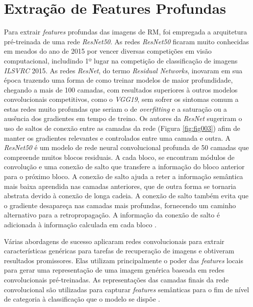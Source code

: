 \section{Extração de Features Profundas}
Para extrair \textit{features} profundas das imagens de \gls{RM}, foi empregada a arquitetura pré-treinada de uma rede \textit{ResNet50}. As redes \textit{ResNet50} ficaram muito conhecidas em meados do ano de 2015 por vencer diversas competições em visão computacional, includindo 1º lugar na competição de classificação de imagens \textit{ILSVRC} 2015. As redes \textit{ResNet}, do termo \textit{Residual Networks}, inovaram em sua época trazendo uma forma  de como treinar modelos de maior profundidade, chegando a mais de 100 camadas, com resultados superiores à outros modelos convolucionais competitivos, como o \textit{VGG19}, sem sofrer os sintomas comum a estas redes muito profundas que seriam o de \textit{overfitting} e a saturação ou a ausência dos gradientes em tempo de treino. Os autores da \textit{ResNet} sugeriram o uso de saltos de conexão entre as camadas da rede (Figura \ref{fig:fig003}) afim de manter os gradientes relevantes e controlados entre uma camada e outra.  A \textit{ResNet50} é um modelo de rede neural convolucional profunda de 50 camadas que compreende muitos blocos residuais. A cada bloco, se encontram módulos de convolução e uma conexão de salto que transfere a informação do bloco anterior para o próximo bloco. A conexão de salto ajuda a reter a informação semântica mais baixa aprendida nas camadas anteriores, que de outra forma se tornaria abstrata devido à conexão de longa cadeia. A conexão de salto também evita que o gradiente desapareça nas camadas mais profundas, fornecendo um caminho alternativo para a retropropagação. A informação da conexão de salto é adicionada à informação calculada em cada bloco \cite{heDeepResidualLearning2015}.

Várias abordagens de sucesso aplicaram redes convolucionais para extrair características genéricas para tarefas de recuperação de imagens e obtiveram resultados promissores. Elas utilizam principalmente o poder das \textit{features} locais para gerar uma representação de uma imagem genérica baseada em redes convolucionais pré-treinadas. As representações das camadas finais da rede convolucional são utilizadas para capturar \textit{features} semânticas para o fim de nível de categoria à classificação que o modelo se dispõe \cite{alzubiContentbasedImageRetrieval2017b}.

